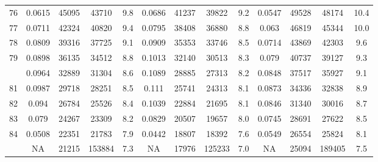 \documentclass[
  14pt,
]{article}
\begin{document}
\begin{longtable}[t]{lcccccccccccc}
76 & 0.0615 & 45095 & 43710 & 9.8 & 0.0686 & 41237 & 39822 & 9.2 & 0.0547 & 49528 & 48174 & 10.4\\
77 & 0.0711 & 42324 & 40820 & 9.4 & 0.0795 & 38408 & 36880 & 8.8 & 0.063 & 46819 & 45344 & 10.0\\
78 & 0.0809 & 39316 & 37725 & 9.1 & 0.0909 & 35353 & 33746 & 8.5 & 0.0714 & 43869 & 42303 & 9.6\\
79 & 0.0898 & 36135 & 34512 & 8.8 & 0.1013 & 32140 & 30513 & 8.3 & 0.079 & 40737 & 39127 & 9.3\\
\addlinespace
80 & 0.0964 & 32889 & 31304 & 8.6 & 0.1089 & 28885 & 27313 & 8.2 & 0.0848 & 37517 & 35927 & 9.1\\
81 & 0.0987 & 29718 & 28251 & 8.5 & 0.111 & 25741 & 24313 & 8.1 & 0.0873 & 34336 & 32838 & 8.9\\
82 & 0.094 & 26784 & 25526 & 8.4 & 0.1039 & 22884 & 21695 & 8.1 & 0.0846 & 31340 & 30016 & 8.7\\
83 & 0.079 & 24267 & 23309 & 8.2 & 0.0829 & 20507 & 19657 & 8.0 & 0.0745 & 28691 & 27622 & 8.5\\
84 & 0.0508 & 22351 & 21783 & 7.9 & 0.0442 & 18807 & 18392 & 7.6 & 0.0549 & 26554 & 25824 & 8.1\\
\addlinespace
85 & NA & 21215 & 153884 & 7.3 & NA & 17976 & 125233 & 7.0 & NA & 25094 & 189405 & 7.5\\*
\end{longtable}
\end{document}

